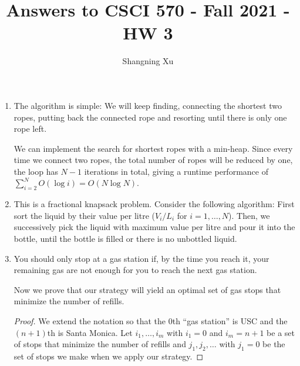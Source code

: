 \documentclass{article}
\title{Answers to CSCI 570 - Fall 2021 - HW 3}
\author{Shangning Xu}
\begin{document}
\maketitle

\begin{enumerate}

\item The algorithm is simple: We will keep finding, connecting the shortest two ropes, putting back the connected rope and resorting until there is only one rope left.

We can implement the search for shortest ropes with a min-heap. Since every time we connect two ropes, the total number of ropes will be reduced by one, the loop has $N - 1$ iterations in total, giving a runtime performance of $\sum_{i = 2}^N O(\log i) = O(N\log N)$.

\item This is a fractional knapsack problem. Consider the following algorithm: First sort the liquid by their value per litre ($V_i/L_i$ for $i = 1, \dots, N$). Then, we successively pick the liquid with maximum value per litre and pour it into the bottle, until the bottle is filled or there is no unbottled liquid.

\item You should only stop at a gas station if, by the time you reach it, your remaining gas are not enough for you to reach the next gas station.

Now we prove that our strategy will yield an optimal set of gas stops that minimize the number of refills.

\begin{proof}
    We extend the notation so that the 0th ``gas station'' is USC and the $(n + 
    1)$th is Santa Monica. Let $i_1, \dots, i_m$ with $i_1 = 0$ and $i_m = n + 1$ be a set of stops that minimize the number of refills and $j_1, j_2, \dots$ with $j_1 = 0$ be the set of stops we make when we apply our strategy.


\end{proof}
\end{enumerate}
\end{document}
